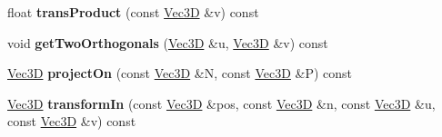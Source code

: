 \begin{DoxyCompactItemize}
\item 
\hypertarget{class_vec3_d_a32af87172c2213797156bf4bd330d62d}{
float {\bfseries transProduct} (const \hyperlink{class_vec3_d}{Vec3D} \&v) const }
\label{class_vec3_d_a32af87172c2213797156bf4bd330d62d}

\item 
\hypertarget{class_vec3_d_af6ab665ae785c15690f0ce9ac45648a5}{
void {\bfseries getTwoOrthogonals} (\hyperlink{class_vec3_d}{Vec3D} \&u, \hyperlink{class_vec3_d}{Vec3D} \&v) const }
\label{class_vec3_d_af6ab665ae785c15690f0ce9ac45648a5}

\item 
\hypertarget{class_vec3_d_a55bf139b1b3ee68d1c9e163c48b7c0bc}{
\hyperlink{class_vec3_d}{Vec3D} {\bfseries projectOn} (const \hyperlink{class_vec3_d}{Vec3D} \&N, const \hyperlink{class_vec3_d}{Vec3D} \&P) const }
\label{class_vec3_d_a55bf139b1b3ee68d1c9e163c48b7c0bc}

\item 
\hypertarget{class_vec3_d_a7a507a9a4fa63d5d4dbea4a6b465881b}{
\hyperlink{class_vec3_d}{Vec3D} {\bfseries transformIn} (const \hyperlink{class_vec3_d}{Vec3D} \&pos, const \hyperlink{class_vec3_d}{Vec3D} \&n, const \hyperlink{class_vec3_d}{Vec3D} \&u, const \hyperlink{class_vec3_d}{Vec3D} \&v) const }
\label{class_vec3_d_a7a507a9a4fa63d5d4dbea4a6b465881b}

\end{DoxyCompactItemize}
